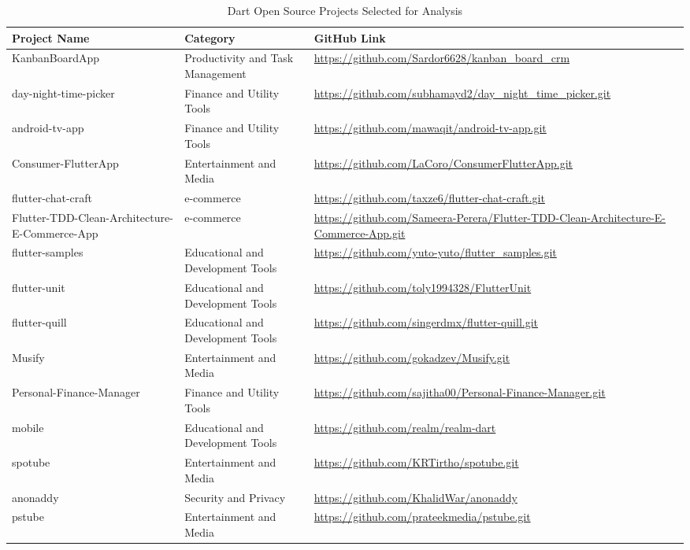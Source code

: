 \begin{table}[htbp]
	\begin{tabular}{p{3cm}|p{5cm}|p{7cm}}
		\hline
		\cellcolor{Gray}Project Name & \cellcolor{Gray}Category & \cellcolor{Gray}GitHub Link  \\ \hline
        KanbanBoardApp & Productivity and Task Management & \url{https://github.com/Sardor6628/kanban_board_crm} \\
        day-night-time-picker & Finance and Utility Tools & \url{https://github.com/subhamayd2/day_night_time_picker.git} \\
        android-tv-app & Finance and Utility Tools & \url{https://github.com/mawaqit/android-tv-app.git} \\
        Consumer-FlutterApp & Entertainment and Media & \url{https://github.com/LaCoro/ConsumerFlutterApp.git} \\
        flutter-chat-craft & e-commerce & \url{https://github.com/taxze6/flutter-chat-craft.git} \\
        Flutter-TDD-Clean-Architecture-E-Commerce-App & e-commerce & \url{https://github.com/Sameera-Perera/Flutter-TDD-Clean-Architecture-E-Commerce-App.git} \\
        flutter-samples & Educational and Development Tools & \url{https://github.com/yuto-yuto/flutter_samples.git} \\
        flutter-unit & Educational and Development Tools & \url{https://github.com/toly1994328/FlutterUnit} \\
        flutter-quill & Educational and Development Tools & \url{https://github.com/singerdmx/flutter-quill.git} \\
        Musify & Entertainment and Media & \url{https://github.com/gokadzev/Musify.git} \\
        Personal-Finance-Manager & Finance and Utility Tools & \url{https://github.com/sajitha00/Personal-Finance-Manager.git} \\
        mobile & Educational and Development Tools & \url{https://github.com/realm/realm-dart} \\
        spotube & Entertainment and Media & \url{https://github.com/KRTirtho/spotube.git} \\
        anonaddy & Security and Privacy & \url{https://github.com/KhalidWar/anonaddy} \\
        pstube & Entertainment and Media & \url{https://github.com/prateekmedia/pstube.git} \\
    \end{tabular}
	\caption{ Dart Open Source Projects Selected for Analysis \label{tab:dart_projects}}
\end{table}













\clearpage
